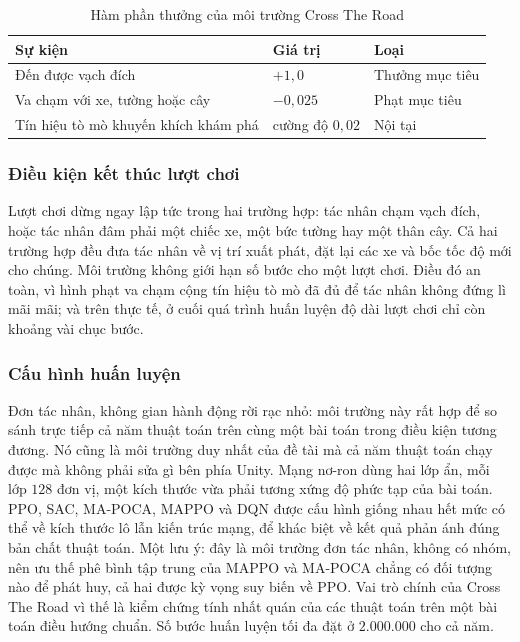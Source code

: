 \begin{table}[H]
\centering
\caption{Hàm phần thưởng của môi trường Cross The Road}
\label{tab:reward_crossroad}
\renewcommand{\arraystretch}{1.4}
\tablefont
\begin{tabular}{|p{6.5cm}|>{\centering\arraybackslash}p{3cm}|p{3.5cm}|}
\hline
\textbf{Sự kiện} & \textbf{Giá trị} & \textbf{Loại} \\
\hline
Đến được vạch đích & $+1{,}0$ & Thưởng mục tiêu \\
\hline
Va chạm với xe, tường hoặc cây & $-0{,}025$ & Phạt mục tiêu \\
\hline
Tín hiệu tò mò khuyến khích khám phá & cường độ $0{,}02$ & Nội tại \\
\hline
\end{tabular}
\end{table}

\subsubsection{Điều kiện kết thúc lượt chơi}
\indent Lượt chơi dừng ngay lập tức trong hai trường hợp: tác nhân chạm vạch đích, hoặc
tác nhân đâm phải một chiếc xe, một bức tường hay một thân cây. Cả hai trường hợp đều đưa
tác nhân về vị trí xuất phát, đặt lại các xe và bốc tốc độ mới cho chúng. Môi trường không
giới hạn số bước cho một lượt chơi. Điều đó an toàn, vì hình phạt va chạm cộng tín hiệu tò
mò đã đủ để tác nhân không đứng lì mãi mãi; và trên thực tế, ở cuối quá trình huấn luyện
độ dài lượt chơi chỉ còn khoảng vài chục bước.

\subsubsection{Cấu hình huấn luyện}
\indent Đơn tác nhân, không gian hành động rời rạc nhỏ: môi trường này rất hợp để so sánh trực
tiếp cả năm thuật toán trên cùng một bài toán trong điều kiện tương đương. Nó
cũng là môi trường duy nhất của đề tài mà cả năm thuật toán chạy được mà không phải sửa gì
bên phía Unity. Mạng nơ-ron dùng hai lớp ẩn, mỗi lớp $128$ đơn vị, một
kích thước vừa phải tương xứng độ phức tạp của bài toán. PPO, SAC, MA-POCA, MAPPO và DQN
được cấu hình giống nhau hết mức có thể về kích thước lô lẫn kiến trúc mạng, để khác biệt
về kết quả phản ánh đúng bản chất thuật toán. Một lưu ý: đây là môi trường đơn tác nhân,
không có nhóm, nên ưu thế phê bình tập trung của MAPPO và MA-POCA chẳng có đối tượng nào để
phát huy, cả hai được kỳ vọng suy biến về PPO. Vai trò chính của Cross The Road vì thế
là kiểm chứng tính nhất quán của các thuật toán trên một bài toán điều hướng chuẩn. Số
bước huấn luyện tối đa đặt ở $2.000.000$ cho cả năm.

